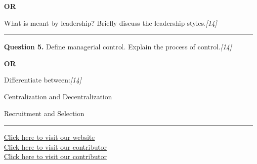\documentclass[11pt,a4paper]{article}
\newcommand{\pts}[1]{\hfill   \textit{[#1]}}
\begin{document}
\centerline{   \textbf{OR}}

What is meant by leadership? Briefly discuss the leadership styles.\pts{14}

\medskip\rule{\linewidth}{0.2pt}




\noindent   \textbf{Question 5.}
Define managerial control. Explain the process of control.\pts{14}

\centerline{   \textbf{OR}}

Differentiate between:\pts{14}

\begin{parts}
  \item Centralization and Decentralization
  \item Recruitment and Selection
\end{parts}

\vfill
\rule{\linewidth}{0.4pt}

\begin{center}\small
\href{https://bhu-exam.vercel.app/}{Click here to visit our website}\\[4pt]
\href{https://me-aryan.vercel.app/}{Click here to visit our contributor}\\[4pt]
\href{https://quashan-me.vercel.app/}{Click here to visit our contributor}
\end{center}
\end{document}
